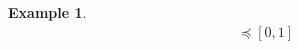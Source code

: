 \documentclass[12pt, reqno]{amsart}
\theoremstyle{definition}
\newtheorem{example}{Example}[section]
\theoremstyle{remark}
\numberwithin{equation}{section}
\begin{document}
\begin{example}
\begin{align*}
    [0,1] &\preceq [0,1]\\
\end{align*}

\end{example}
\end{document}
